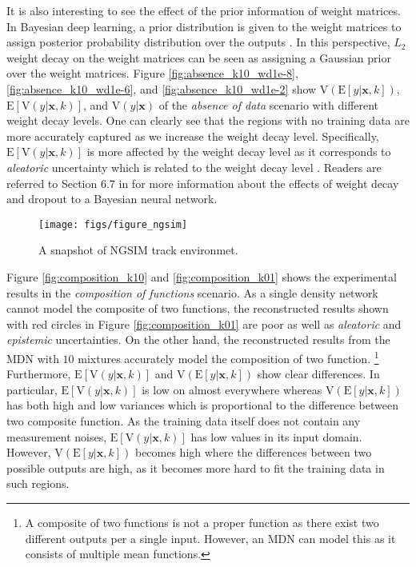 \documentclass[letterpaper, 10 pt, conference]{ieeeconf}  %
\def\Bx{\mathbf{x}} \def\By{\mathbf{y}} \def\Bp{\mathbf{p}}
\begin{document}
It is also interesting to see the effect of the prior information 
of weight matrices. 
In Bayesian deep learning, a prior distribution is given to the weight matrices
to assign posterior probability distribution over the outputs
\cite{Gal_16_thesis}.
In this perspective, $L_2$ weight decay 
on the weight matrices can be seen as assigning a Gaussian 
prior over the weight matrices. 
Figure \ref{fig:absence_k10_wd1e-8}, \ref{fig:absence_k10_wd1e-6},
and \ref{fig:absence_k10_wd1e-2} show
$\mathrm{V}(\mathrm{E}[y|\Bx, k])$, 
$\mathrm{E}[\mathrm{V}(y|\Bx, k)]$,
and
$\mathrm{V}(y|\Bx)$
of the 
\textit{absence of data} scenario
with different weight decay levels.
One can clearly see that the regions with no training data
are more accurately captured 
as we increase the weight decay level.
Specifically, $\mathrm{E}[\mathrm{V}(y|\Bx, k)]$
is more affected by the weight decay level
as it corresponds to \textit{aleatoric} uncertainty
which is related to the weight decay level \cite{Gal_16_thesis}.
Readers are referred to Section 6.7 in \cite{Gal_16_thesis}
for more information about the effects of weight decay and
dropout to a Bayesian neural network. 

\begin{figure*}[!t] \centering
	\texttt{[image: figs/figure\_ngsim]}
	\label{fig:trackres_a}
	\caption{
		A snapshot of NGSIM track environmet. 
		}
	\label{fig:ngsim}
\end{figure*}


Figure \ref{fig:composition_k10} and \ref{fig:composition_k01}
shows the experimental results in the
\textit{composition of functions} scenario. 
As a single density network cannot model the composite of two 
functions, the reconstructed results shown with red circles 
in Figure \ref{fig:composition_k01} are poor as well as 
\textit{aleatoric} and \textit{epistemic} uncertainties. 
On the other hand, the reconstructed results from 
the MDN with $10$ mixtures 
accurately model the composition of two function. \footnote{
A composite of two functions is not a proper function as
there exist two different outputs per a single input. 
However, an MDN can model this as it
consists of multiple mean functions. 
}
Furthermore, 
$\mathrm{E}[\mathrm{V}(y|\Bx, k)]$
and $\mathrm{V}(\mathrm{E}[y|\Bx, k])$
show clear differences.
In particular, 
$\mathrm{E}[\mathrm{V}(y|\Bx, k)]$
is low on almost everywhere whereas 
$\mathrm{V}(\mathrm{E}[y|\Bx, k])$
has both high and low variances
which is proportional to the difference
between two composite function. 
As the training data itself does not contain 
any measurement noises,
$\mathrm{E}[\mathrm{V}(y|\Bx, k)]$
has low values in its input domain. 
However, 
$\mathrm{V}(\mathrm{E}[y|\Bx, k])$ becomes high 
where the differences between two possible outputs
are high, as it becomes more hard to fit the training data
in such regions. 
\end{document}
